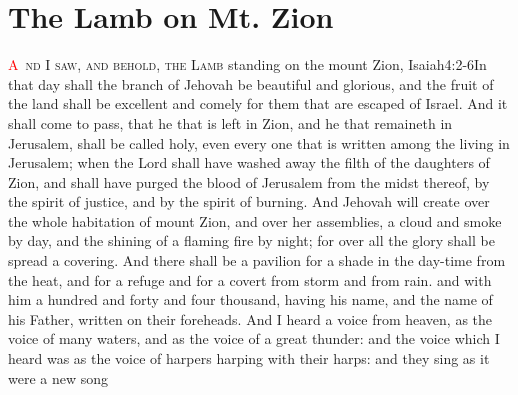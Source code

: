 
\chapter{The Lamb on Mt. Zion}
\fancyhead{} %
\lettrine[lines=3,slope=0.5em]{\textcolor{red}{A}}{\ nd I saw, and behold, the Lamb} standing on the mount Zion,%
				  {Isaiah}{4:2-6}{In that day shall the branch of Jehovah be beautiful and glorious, and the fruit of the land shall be excellent and comely for them that are escaped of Israel. And it shall come to pass, that he that is left in Zion, and he that remaineth in Jerusalem, shall be called holy, even every one that is written among the living in Jerusalem; when the Lord shall have washed away the filth of the daughters of Zion, and shall have purged the blood of Jerusalem from the midst thereof, by the spirit of justice, and by the spirit of burning. And Jehovah will create over the whole habitation of mount Zion, and over her assemblies, a cloud and smoke by day, and the shining of a flaming fire by night; for over all the glory shall be spread a covering. And there shall be a pavilion for a shade in the day-time from the heat, and for a refuge and for a covert from storm and from rain.} %
and with him a hundred and forty and four thousand, having his name, and the name of his Father, written on their foreheads.%
And I heard a voice from heaven, as the voice of many waters, and as the voice of a great thunder: and the voice which I heard was as the voice of harpers harping with their harps: 
and they sing as it were a new song%
